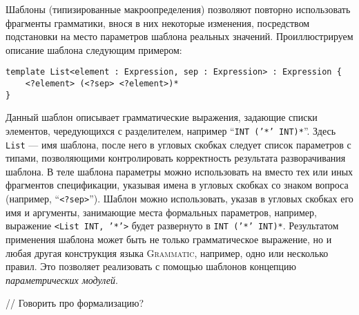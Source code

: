 \documentclass[12pt,a4paper]{article}
\newcommand{\term}[1]{\emph{#1}}
\newcommand{\code}[1]{\mbox{\texttt{#1}}}
\newcommand{\tool}[1]{\textsc{#1}}
\begin{document}
Шаблоны (типизированные макроопределения) позволяют повторно использовать фрагменты грамматики, внося в них некоторые изменения, посредством подстановки на место параметров шаблона реальных значений. Проиллюстрируем описание шаблона следующим примером:
\begin{lstlisting}
template List<element : Expression, sep : Expression> : Expression {
	<?element> (<?sep> <?element>)*
}
\end{lstlisting}
Данный шаблон описывает грамматические выражения, задающие списки элементов, чередующихся с разделителем, например ``\code{INT ('*' INT)*}''. Здесь \code{List} --- имя шаблона, после него в угловых скобках следует список параметров с типами, позволяющими контролировать корректность результата разворачивания шаблона. В теле шаблона параметры можно использовать на вместо тех или иных фрагментов спецификации, указывая имена в угловых скобках со знаком вопроса (например, ``\code{<?sep>}''). Шаблон можно использовать, указав в угловых скобках его имя и аргументы, занимающие места формальных параметров, например, выражение \code{<List INT, '*'>} будет развернуто в \code{INT ('*' INT)*}. Результатом применения шаблона может быть не только грамматическое выражение, но и любая другая конструкция языка \tool{Grammatic}, например, одно или несколько правил. Это позволяет реализовать с помощью шаблонов концепцию \term{параметрических модулей}. 

// Говорить про формализацию?
\end{document}
